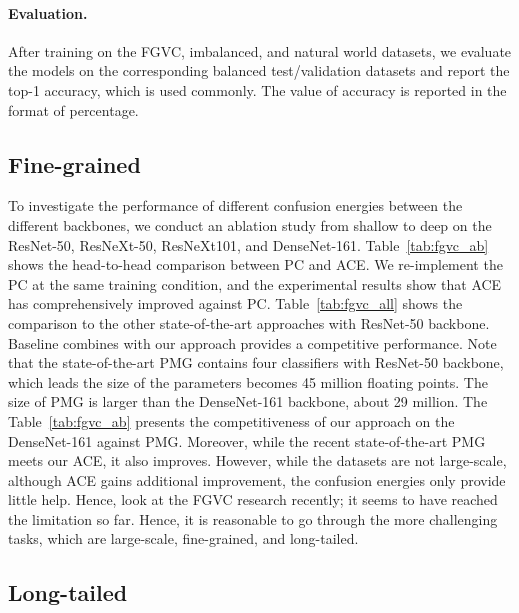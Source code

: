 \documentclass{article}
\begin{document}
\paragraph{Evaluation.} After training on the FGVC, imbalanced, and natural world datasets, we evaluate the models on the corresponding balanced test/validation datasets and report the top-1 accuracy, which is used commonly. The value of accuracy is reported in the format of percentage.

\subsection{Fine-grained}


To investigate the performance of different confusion energies between the different backbones, we conduct an ablation study from shallow to deep on the ResNet-50, ResNeXt-50, ResNeXt101, and DenseNet-161. Table~\ref{tab:fgvc_ab} shows the head-to-head comparison between PC and ACE.  We re-implement the PC at the same training condition, and the experimental results show that ACE has comprehensively improved against PC. Table~\ref{tab:fgvc_all} shows the comparison to the other state-of-the-art approaches with ResNet-50 backbone. Baseline combines with our approach provides a competitive performance. Note that the state-of-the-art PMG \cite{du2020fine} contains four classifiers with ResNet-50 backbone, which leads the size of the parameters becomes 45 million floating points. The size of PMG is larger than the DenseNet-161 backbone, about 29 million. The Table~\ref{tab:fgvc_ab} presents the competitiveness of our approach on the DenseNet-161 against PMG. Moreover, while the recent state-of-the-art PMG meets our ACE, it also improves. However, while the datasets are not large-scale, although ACE gains additional improvement, the confusion energies only provide little help. Hence, look at the FGVC research recently; it seems to have reached the limitation so far. Hence, it is reasonable to go through the more challenging tasks, which are large-scale, fine-grained, and long-tailed.

\subsection{Long-tailed}
\end{document}
